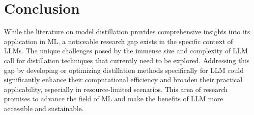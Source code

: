 \section*{Conclusion}

While the literature on model distillation provides comprehensive insights into its application in ML, a noticeable research gap exists in the specific context of LLMs. The unique challenges posed by the immense size and complexity of LLM call for distillation techniques that currently need to be explored. Addressing this gap by developing or optimizing distillation methods specifically for LLM could significantly enhance their computational efficiency and broaden their practical applicability, especially in resource-limited scenarios. This area of research promises to advance the field of ML and make the benefits of LLM more accessible and sustainable.
